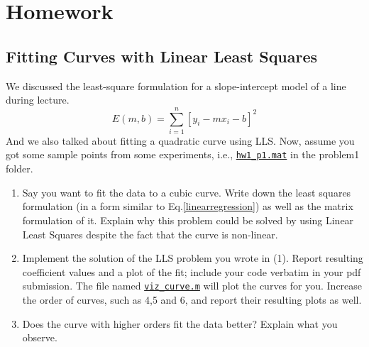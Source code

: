 \section{Homework \thesection}


\subsection{Fitting Curves with Linear Least Squares}
We discussed the least-square formulation for a slope-intercept model of a line during lecture.
\begin{equation}\label{linearregression}
E(m, b)=\sum_{i=1}^{n}[y_i-mx_i-b]^2
\end{equation}
And we also talked about fitting a quadratic curve using LLS.
Now, assume you got some sample points from some experiments, i.e., \href{./hw1/problem1/hw1_p1.mat}{\texttt{hw1\_p1.mat}} in the problem1 folder.

\begin{enumerate}
	\item Say you want to fit the data to a cubic curve.
	Write down the least squares formulation (in a form similar to Eq.\ref{linearregression}) as well as the matrix formulation of it.
	Explain why this problem could be solved by using Linear Least Squares despite the fact that the curve is non-linear.
	\item Implement the solution of the LLS problem you wrote in (1).
	Report resulting coefficient values and a plot of the fit;
	include your code verbatim in your pdf submission.
	The file named \href{./hw1/problem1/viz_curve.m}{\texttt{viz\_curve.m}} will plot the curves for you.
	Increase the order of curves, such as 4,5 and 6, and report their resulting plots as well.
	\item Does the curve with higher orders fit the data better?
	Explain what you observe.
\end{enumerate}


